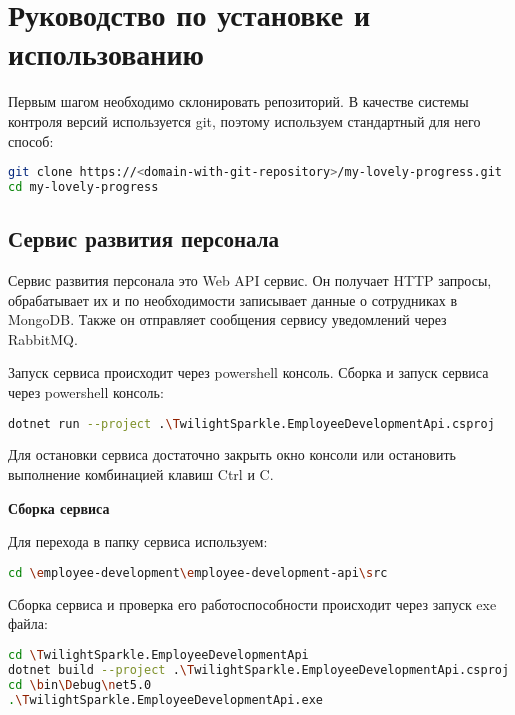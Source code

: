 \section{Руководство по установке и использованию}\label{sec:manual}

Первым шагом необходимо склонировать репозиторий. В качестве системы контроля версий используется git, поэтому используем стандартный для него способ:

\begin{lstlisting}[language=bash]
git clone https://<domain-with-git-repository>/my-lovely-progress.git
cd my-lovely-progress
\end{lstlisting}

\subsection{Сервис развития персонала}

Сервис развития персонала это Web API сервис. Он получает HTTP запросы, обрабатывает их и по необходимости записывает данные о сотрудниках в MongoDB. Также он отправляет сообщения сервису уведомлений через RabbitMQ.

Запуск сервиса происходит через powershell консоль. Сборка и запуск сервиса через powershell консоль:

\begin{lstlisting}[language=bash]
dotnet run --project .\TwilightSparkle.EmployeeDevelopmentApi.csproj
\end{lstlisting}

Для остановки сервиса достаточно закрыть окно консоли или остановить выполнение комбинацией клавиш Ctrl и C.

\bigskip
\textbf{Сборка сервиса}

Для перехода в папку сервиса используем:

\begin{lstlisting}[language=bash]
cd \employee-development\employee-development-api\src
\end{lstlisting}

Сборка сервиса и проверка его работоспособности происходит через запуск exe файла:

\begin{lstlisting}[language=bash]
cd \TwilightSparkle.EmployeeDevelopmentApi
dotnet build --project .\TwilightSparkle.EmployeeDevelopmentApi.csproj
cd \bin\Debug\net5.0
.\TwilightSparkle.EmployeeDevelopmentApi.exe
\end{lstlisting}

